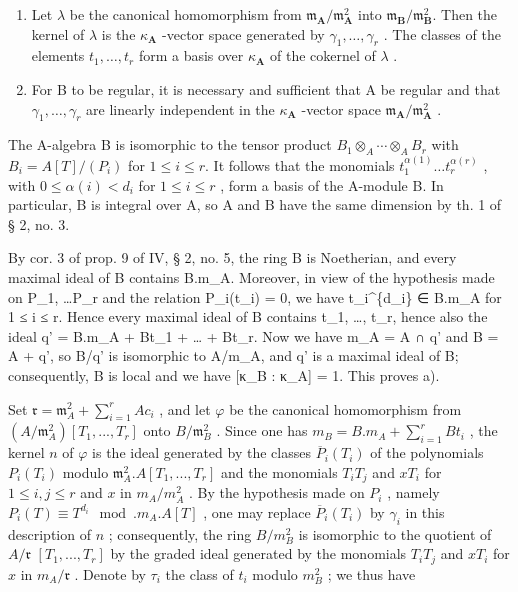 \begin{enumerate}
\def\labelenumi{\alph{enumi})}
\setcounter{enumi}{1}
\item
  Let \(\lambda\) be the canonical homomorphism from \(\mathfrak{m}_{\mathbf{A}} / \mathfrak{m}_{\mathbf{A}}^{2}\) into \(\mathfrak{m}_{\mathbf{B}} / \mathfrak{m}_{\mathbf{B}}^{2}\). Then the kernel of \(\lambda\) is the \(\kappa_{\mathbf{A}}\) -vector space generated by \(\gamma_{1}, \ldots, \gamma_{r}\) . The classes of the elements \(t_{1}, \ldots, t_{r}\) form a basis over \(\kappa_{\mathbf{A}}\) of the cokernel of \(\lambda\) .
\item
  For B to be regular, it is necessary and sufficient that A be regular and that \(\gamma_{1},\ldots,\gamma_{r}\) are linearly independent in the \(\kappa_{\mathbf{A}}\) -vector space \(\mathfrak{m}_{\mathbf{A}}/\mathfrak{m}_{\mathbf{A}}^{2}\) .
\end{enumerate}

The A-algebra B is isomorphic to the tensor product \(B_{1} \otimes_{A} \cdots \otimes_{A} B_{r}\) with \(B_{i} = A[T]/(P_{i})\) for \(1 \leqslant i \leqslant r\). It follows that the monomials \(t_{1}^{\alpha(1)} \ldots t_{r}^{\alpha(r)}\) , with \(0 \leqslant \alpha(i) < d_{i}\) for \(1 \leqslant i \leqslant r\) , form a basis of the A-module B. In particular, B is integral over A, so A and B have the same dimension by th. 1 of § 2, no. 3.

By cor. 3 of prop. 9 of IV, § 2, no. 5, the ring B is Noetherian, and every maximal ideal of B contains B.m\_A. Moreover, in view of the hypothesis made on P\_1, \ldots P\_r and the relation P\_i(t\_i) = 0, we have t\_i\^{}\{d\_i\} ∈ B.m\_A for 1 ≤ i ≤ r. Hence every maximal ideal of B contains t\_1, \ldots, t\_r, hence also the ideal q' = B.m\_A + Bt\_1 + \ldots{} + Bt\_r. Now we have m\_A = A ∩ q' and B = A + q', so B/q' is isomorphic to A/m\_A, and q' is a maximal ideal of B; consequently, B is local and we have {[}κ\_B : κ\_A{]} = 1. This proves a).

Set \(\mathfrak{r} = \mathfrak{m}_{A}^{2} + \sum_{i=1}^{r} A c_i\) , and let \(\varphi\) be the canonical homomorphism from \((A/\mathfrak{m}_{A}^{2})[T_1, ..., T_r]\) onto \(B/\mathfrak{m}_{B}^{2}\) . Since one has \(m_B = B.m_A + \sum_{i=1}^{r} B t_i\) , the kernel \(n\) of \(\varphi\) is the ideal generated by the classes \(\overline{P}_i(T_i)\) of the polynomials \(P_i(T_i)\) modulo \(\mathfrak{m}_{A}^{2}.A[T_1, ..., T_r]\) and the monomials \(T_i T_j\) and \(x T_i\) for \(1 \leqslant i, j \leqslant r\) and \(x\) in \(m_A/m_A^2\) . By the hypothesis made on \(P_i\) , namely \(P_i(T) \equiv T^{d_i} \mod. m_A.A[T]\) , one may replace \(\overline{P}_i(T_i)\) by \(\gamma_i\) in this description of \(n\) ; consequently, the ring \(B/m_B^2\) is isomorphic to the quotient of \(A/\mathfrak{r}\) \([T_{1}, ..., T_{r}]\) by the graded ideal generated by the monomials \(T_{i}T_{j}\) and \(xT_{i}\) for \(x\) in \(m_A/\mathfrak{r}\) . Denote by \(\tau_{i}\) the class of \(t_{i}\) modulo \(m_{B}^{2}\) ; we thus have

